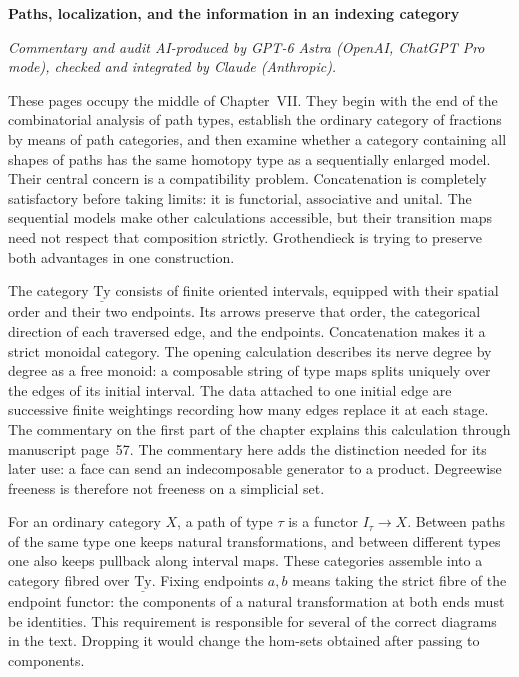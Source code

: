\noindent\textbf{Paths, localization, and the information in an indexing category}

\medskip
\noindent\emph{Commentary and audit AI-produced by GPT-6 Astra (OpenAI, ChatGPT Pro mode), checked and integrated by Claude (Anthropic).}

\medskip
These pages occupy the middle of Chapter~VII.  They begin with the end of the combinatorial analysis of path types, establish the ordinary category of fractions by means of path categories, and then examine whether a category containing all shapes of paths has the same homotopy type as a sequentially enlarged model.  Their central concern is a compatibility problem.  Concatenation is completely satisfactory before taking limits: it is functorial, associative and unital.  The sequential models make other calculations accessible, but their transition maps need not respect that composition strictly.  Grothendieck is trying to preserve both advantages in one construction.

The category $\underline{\mathrm{Ty}}$ consists of finite oriented intervals, equipped with their spatial order and their two endpoints.  Its arrows preserve that order, the categorical direction of each traversed edge, and the endpoints.  Concatenation makes it a strict monoidal category.  The opening calculation describes its nerve degree by degree as a free monoid: a composable string of type maps splits uniquely over the edges of its initial interval.  The data attached to one initial edge are successive finite weightings recording how many edges replace it at each stage.  The commentary on the first part of the chapter explains this calculation through manuscript page~57.  The commentary here adds the distinction needed for its later use: a face can send an indecomposable generator to a product.  Degreewise freeness is therefore not freeness on a simplicial set.

For an ordinary category $X$, a path of type $\tau$ is a functor $I_\tau\to X$.  Between paths of the same type one keeps natural transformations, and between different types one also keeps pullback along interval maps.  These categories assemble into a category fibred over $\underline{\mathrm{Ty}}$.  Fixing endpoints $a,b$ means taking the strict fibre of the endpoint functor: the components of a natural transformation at both ends must be identities.  This requirement is responsible for several of the correct diagrams in the text.  Dropping it would change the hom-sets obtained after passing to components.

